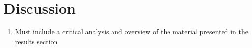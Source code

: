 \section{Discussion}

\begin{enumerate}
    \item Must include a critical analysis and overview of the material presented  in the results section
\end{enumerate}